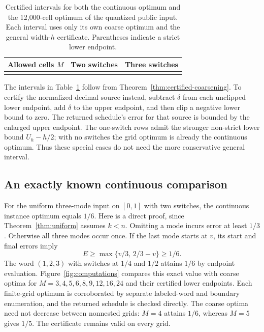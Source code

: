 \begin{table}[tb]
\centering\small
\caption{Certified intervals for both the continuous optimum and the
12,000-cell optimum of the quantized public input. Each interval uses only its
own coarse optimum and the general width-$h$ certificate. Parentheses indicate
a strict lower endpoint.}
\label{tab:public-certificates}
\begin{tabular}{@{}rcc@{}}
\toprule
Allowed cells $M$ & Two switches & Three switches\\
\midrule
\\
\bottomrule
\end{tabular}
\end{table}

The intervals in Table~\ref{tab:public-certificates} follow from
Theorem~\ref{thm:certified-coarsening}. To certify the normalized decimal source
instead, subtract $\delta$ from each unclipped lower endpoint, add $\delta$
to the upper endpoint, and then clip a negative lower bound to zero. The
returned schedule's error for that source is bounded by the enlarged upper
endpoint. The one-switch rows admit the stronger non-strict lower bound
$U_h-h/2$; with no switches the grid optimum is already the continuous optimum.
Thus these special cases do not need the more conservative general interval.

\subsection{An exactly known continuous comparison}

For the uniform three-mode input on $[0,1]$ with two switches, the continuous
instance optimum equals $1/6$. Here is a direct proof, since
Theorem~\ref{thm:uniform} assumes $k<n$. Omitting a mode incurs error at least
$1/3$. Otherwise all three modes occur once. If the last mode starts at $v$,
its start and final errors imply
\[
 E\ge\max\{v/3,\,2/3-v\}\ge1/6.
\]
The word $(1,2,3)$ with switches at $1/4$ and $1/2$ attains $1/6$ by endpoint
evaluation. Figure~\ref{fig:computations} compares this exact value with coarse
optima for $M=3,4,5,6,8,9,12,16,24$ and their certified lower endpoints.
Each finite-grid optimum is corroborated by separate labeled-word and
boundary enumeration, and the returned schedule is checked directly.
The coarse optima need not decrease between nonnested grids: $M=4$ attains
$1/6$, whereas $M=5$ gives $1/5$. The certificate remains valid on every grid.

